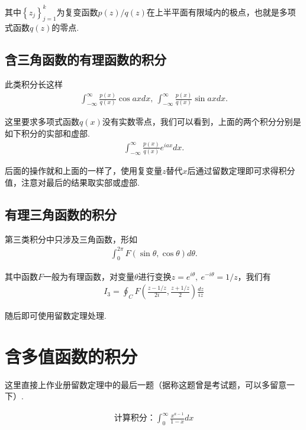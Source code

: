     其中$\left\{z_j\right\}_{j=1}^{k}$为复变函数$p(z)/q(z)$在上半平面有限域内的极点，也就是多项式函数$q(z)$的零点.

    \subsection{含三角函数的有理函数的积分}

    此类积分长这样
    \begin{align*}
        \int_{-\infty}^{\infty}\frac{p(x)}{q(x)}\cos{ax}dx,\ \int_{-\infty}^{\infty}\frac{p(x)}{q(x)}\sin{ax}dx.
    \end{align*}

    这里要求多项式函数$q(x)$没有实数零点，我们可以看到，上面的两个积分分别是如下积分的实部和虚部.
    \begin{align*}
        \int_{-\infty}^{\infty}\frac{p(x)}{q(x)}e^{iax}dx.
    \end{align*}

    后面的操作就和上面的一样了，使用复变量$z$替代$x$后通过留数定理即可求得积分值，注意对最后的结果取实部或虚部.

    \subsection{有理三角函数的积分}

    第三类积分中只涉及三角函数，形如
    \begin{align*}
        \int_{0}^{2\pi}F(\sin{\theta},\cos{\theta})d\theta.
    \end{align*}

    其中函数$F$一般为有理函数，对变量$\theta$进行变换$z=e^{i\theta},\ e^{-i\theta}=1/z$，我们有
    \begin{align*}
        I_3=\oint_{C}F\left(\frac{z-1/z}{2i}, \frac{z+1/z}{2}\right)\frac{dz}{iz}
    \end{align*}

    随后即可使用留数定理处理.

    \section{含多值函数的积分}

        这里直接上作业册留数定理中的最后一题（据称这题曾是考试题，可以多留意一下）.
        \begin{example}\label{ex:multi_valued}
            \begin{align*}
            \text{计算积分：}\int_0^\infty \frac{x^{a-1}}{1-x}dx
            \end{align*}
        \end{example}

